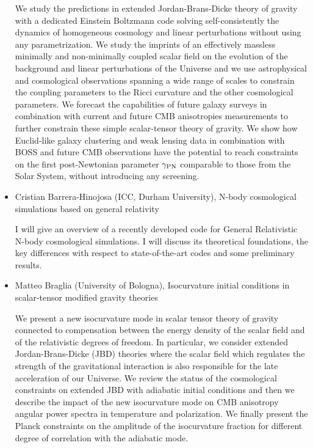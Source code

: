 \documentclass[letterpaper,12pt]{article}
\newcommand{\talk}[2]{{\fontspec{Lato Bold} #1,} {\fontspec{Lato Italic} #2}}
\begin{document}
\begin{itemize}
We study the predictions in extended Jordan-Brans-Dicke theory of gravity with a dedicated Einstein Boltzmann code solving self-consistently the dynamics of homogeneous cosmology and linear perturbations without using any parametrization. We study the imprints of an effectively massless minimally and non-minimally coupled scalar field on the evolution of the background and linear perturbations of the Universe and we use astrophysical and cosmological observations spanning a wide range of scales to constrain the coupling parameters to the Ricci curvature and the other cosmological parameters. We forecast the capabilities of future galaxy surveys in combination with current and future CMB anisotropies measurements to further constrain these simple scalar-tensor theory of gravity. We show how Euclid-like galaxy clustering and weak lensing data in combination with BOSS and future CMB observations have the potential to reach constraints on the first post-Newtonian parameter $\gamma_{\rm PN}$ comparable to those from the Solar System, without introducing any screening.


\item \talk{Cristian Barrera-Hinojosa (ICC, Durham University)}{N-body cosmological simulations based on general relativity}

I will give an overview of a recently developed code for General Relativistic N-body cosmological simulations. I will discuss its theoretical foundations, the key differences with respect to state-of-the-art codes and some preliminary results.


\item \talk{Matteo Braglia (University of Bologna)}{Isocurvature initial conditions in scalar-tensor modified gravity theories}

We present a new isocurvature mode in scalar tensor theory of gravity connected to compensation between the energy density of the scalar field and of the relativistic degrees of freedom. In particular, we consider extended Jordan-Brans-Dicke (JBD) theories where the scalar field which regulates the strength of the gravitational interaction is also responsible for the late acceleration of our Universe. We review the status of the cosmological constraints on extended JBD with adiabatic initial conditions and then we describe the impact of the new isocurvature mode on CMB anisotropy angular power spectra in temperature and polarization. We finally present the Planck constraints on the amplitude of the isocurvature fraction for different degree of correlation with the adiabatic mode.



\end{itemize}
\end{document}
